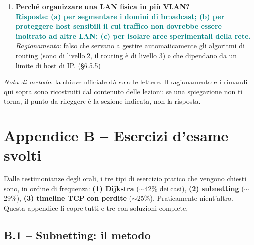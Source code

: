 \documentclass[12pt, a4paper]{article}
\begin{document}
\begin{enumerate}[leftmargin=*, resume]
\item \textbf{Perché organizzare una LAN fisica in più VLAN?}\\
\textcolor{teal}{\textbf{Risposte: (a) per segmentare i domini di broadcast; (b) per proteggere host sensibili il cui traffico non dovrebbe essere inoltrato ad altre LAN; (c) per isolare aree sperimentali della rete.}}\\
\textit{Ragionamento}: \textcolor{red!70!black}{falso} che servano a gestire automaticamente gli algoritmi di routing (sono di livello 2, il routing è di livello 3) o che dipendano da un limite di host di IP. (\S6.5.5)

\end{enumerate}

\bigskip
\noindent\textit{Nota di metodo}: la chiave ufficiale dà solo le lettere. Il ragionamento e i rimandi qui sopra sono ricostruiti dal contenuto delle lezioni: se una spiegazione non ti torna, il punto da rileggere è la sezione indicata, non la risposta.


\section*{Appendice B -- Esercizi d'esame svolti}

\begin{tcolorbox}[colback=red!5, colframe=red!60!black, title=\textbf{Leggi prima questo}]
Dalle testimonianze degli orali, i tre tipi di esercizio pratico che vengono chiesti sono, in ordine di frequenza: \textbf{(1) Dijkstra} ($\sim$42\% dei casi), \textbf{(2) subnetting} ($\sim$29\%), \textbf{(3) timeline TCP con perdite} ($\sim$25\%). Praticamente nient'altro. Questa appendice li copre tutti e tre con soluzioni complete.
\end{tcolorbox}

\subsection*{B.1 -- Subnetting: il metodo}
\end{document}
